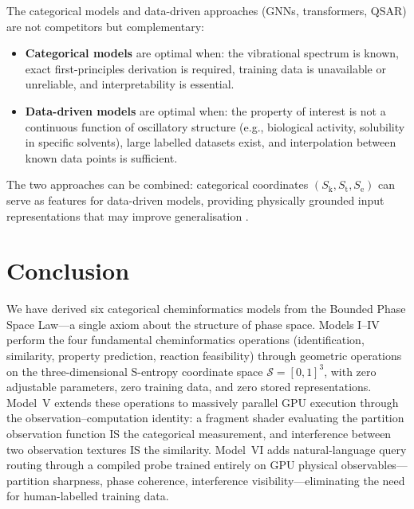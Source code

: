 \documentclass[11pt,twocolumn,a4paper]{article}
\theoremstyle{definition}
\theoremstyle{remark}
\newcommand{\Sk}{S_{\mathrm{k}}}
\newcommand{\St}{S_{\mathrm{t}}}
\newcommand{\Se}{S_{\mathrm{e}}}
\newcommand{\Sspace}{\mathcal{S}}
\begin{document}
The categorical models and data-driven approaches (GNNs, transformers, QSAR) are not competitors but complementary:

\begin{itemize}[nosep]
\item \textbf{Categorical models} are optimal when: the vibrational spectrum is known, exact first-principles derivation is required, training data is unavailable or unreliable, and interpretability is essential.

\item \textbf{Data-driven models} are optimal when: the property of interest is not a continuous function of oscillatory structure (e.g., biological activity, solubility in specific solvents), large labelled datasets exist, and interpolation between known data points is sufficient.
\end{itemize}

The two approaches can be combined: categorical coordinates $(\Sk, \St, \Se)$ can serve as features for data-driven models, providing physically grounded input representations that may improve generalisation \citep{duvenaud2015}.


\section{Conclusion}
\label{sec:conclusion}

We have derived six categorical cheminformatics models from the Bounded Phase Space Law---a single axiom about the structure of phase space. Models I--IV perform the four fundamental cheminformatics operations (identification, similarity, property prediction, reaction feasibility) through geometric operations on the three-dimensional S-entropy coordinate space $\Sspace = [0,1]^3$, with zero adjustable parameters, zero training data, and zero stored representations. Model~V extends these operations to massively parallel GPU execution through the observation--computation identity: a fragment shader evaluating the partition observation function IS the categorical measurement, and interference between two observation textures IS the similarity. Model~VI adds natural-language query routing through a compiled probe trained entirely on GPU physical observables---partition sharpness, phase coherence, interference visibility---eliminating the need for human-labelled training data.
\end{document}
